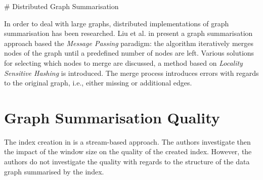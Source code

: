 \# Distributed Graph Summarisation

In order to deal with large graphs, distributed implementations of graph summarisation has been researched.
Liu et al. in \cite{liu:cikm:2014} present a graph summarisation approach based the \emph{Message Passing} paradigm: the algorithm iteratively merges nodes of the graph until a predefined number of nodes are left. Various solutions for selecting which nodes to merge are discussed, a method based on \emph{Locality Sensitive Hashing} is introduced. The merge process introduces errors with regards to the original graph, i.e., either missing or additional edges.

\section{Graph Summarisation Quality}

The index creation in \cite{konrath:jws:2012} is a stream-based approach. The authors investigate then the impact of the window size on the quality of the created index. However, the authors do not investigate the quality with regards to the structure of the data graph summarised by the index.
